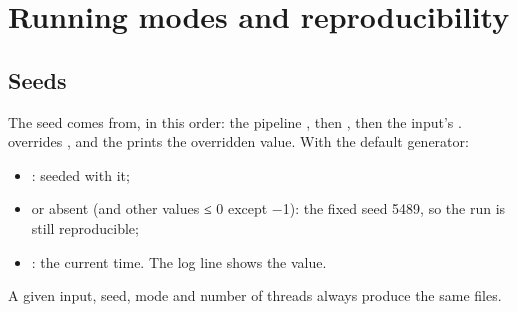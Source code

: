 \chapter{\texorpdfstring{Running modes and reproducibility}{Running modes and reproducibility}}\label{user_manual-08u5frunningu5fandu5freproducibility}
\section{\texorpdfstring{Seeds}{Seeds}}\label{user_manual-08u5frunningu5fandu5freproducibility:81-seeds}
The seed comes from, in this order: the pipeline , then , then the input's \hyperref[param:randomu5fseed]{}.
 overrides \hyperref[param:randomu5fseed]{}, and the  prints the overridden value. With the default generator:

\begin{itemize}
\item {}:  seeded with it;
\item {} or absent (and other values ≤ 0 except −1): the fixed seed 5489, so the run is still reproducible;
\item {}: the current time. The log line  shows the value.
\end{itemize}
A given input, seed, mode and number of threads always produce the same files.

